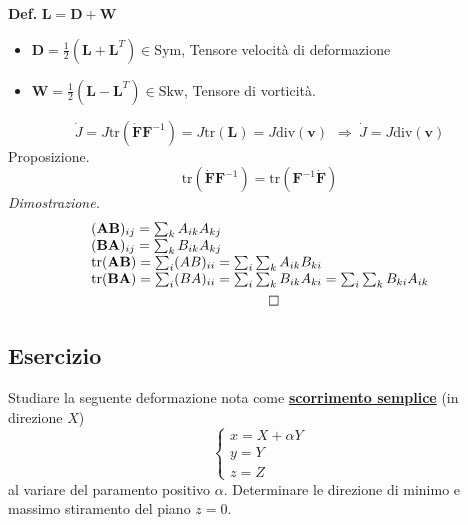 \documentclass[10pt,a4paper,twoside]{book}
\begin{document}
\textbf{\textcolor[rgb]{0.82,0.01,0.11}{Def.}} $\mathbf{L} =\mathbf{D} +\mathbf{W}$
\begin{itemize}
\item $\mathbf{D} =\frac{1}{2}\left(\mathbf{L} +\mathbf{L}^{T}\right) \in \mathrm{Sym}$, Tensore velocità di deformazione
\item $\mathbf{W} =\frac{1}{2}\left(\mathbf{L} -\mathbf{L}^{T}\right) \in \mathrm{Skw}$, Tensore di vorticità.
\end{itemize}
\begin{equation*}
\dot{J} =J\mathrm{tr}\left(\dot{\mathbf{F}}\mathbf{F}^{-1}\right) =J\mathrm{tr} (\mathbf{L} )=J\mathrm{div}(\mathbf{v}) \ \ \Rightarrow \ \boxed{\dot{J} =J\mathrm{div}(\mathbf{v})}
\end{equation*}
Proposizione.
\begin{equation*}
\boxed{\mathrm{tr}\left(\dot{\mathbf{F}}\mathbf{F}^{-1}\right) =\mathrm{tr}\left(\mathbf{F}^{-1}\dot{\mathbf{F}}\right)}
\end{equation*}
\textit{Dimostrazione.}
\begin{gather*}
\begin{array}{ l }
(\mathbf{AB} )_{ij} =\sum _{k} A_{ik} A_{kj}\\
(\mathbf{BA} )_{ij} =\sum _{k} B_{ik} A_{kj}\\
\operatorname{tr} (\mathbf{AB} )=\sum _{i} (AB)_{ii} =\sum _{i}\sum _{k} A_{ik} B_{ki}\\
\operatorname{tr} (\mathbf{BA} )=\sum _{i} (BA)_{ii} =\sum _{i}\sum _{k} B_{ik} A_{ki} =\sum _{i}\sum _{k} B_{ki} A_{ik}
\end{array}\\
\qed 
\end{gather*}
\subsection*{Esercizio}

Studiare la seguente deformazione nota come \underline{\textbf{scorrimento semplice}} (in direzione $X$)
\begin{equation*}
\begin{cases}
x=X+\alpha Y\\
y=Y\\
z=Z
\end{cases}
\end{equation*}
al variare del paramento positivo $\alpha $. Determinare le direzione di minimo e massimo stiramento del piano $z=0$.
\end{document}
